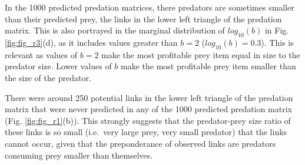 \documentclass{article}
\begin{document}
In the 1000 predicted predation matrices, there predators are sometimes
smaller than their predicted prey, the links in the lower left triangle
of the predation matrix. This is also portrayed in the marginal
distribution of \(log_{10}(b)\) in Fig. \ref{fig:fig_r3}(d), as it
includes values greater than \(b=2\) (\(log_{10}(b)=0.3\)). This is
relevant as values of \(b=2\) make the most profitable prey item equal
in size to the predator size. Lower values of \(b\) make the most
profitable prey item smaller than the size of the predator.

There were around 250 potential links in the lower left triangle of the
predation matrix that were never predicted in any of the 1000 predicted
predation matrix (Fig. \ref{fig:fig_r1}(b)). This strongly suggests that
the predator-prey size ratio of these links is so small (i.e.~very large
prey, very small predator) that the links cannot occur, given that the
preponderance of observed links are predators consuming prey smaller
than themselves.
\end{document}
